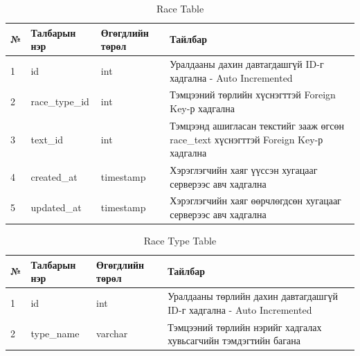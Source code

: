 \begin{table}[h]
	\caption{Race Table}
	\begin{tabular}{|l|l|l|p{8cm}|}
		\hline
		№ & Талбарын нэр   & Өгөгдлийн төрөл & Тайлбар                                                                             \\ \hline
		1 & id             & int             & Уралдааны дахин давтагдашгүй ID-г хадгална - Auto Incremented                       \\ \hline
		2 & race\_type\_id & int             & Тэмцээний төрлийн хүснэгттэй Foreign Key-р хадгална                                 \\ \hline
		3 & text\_id       & int             & Тэмцээнд ашигласан текстийг зааж өгсөн race\_text хүснэгттэй Foreign Key-р хадгална \\ \hline
		4 & created\_at    & timestamp       & Хэрэглэгчийн хаяг үүссэн хугацааг серверээс авч хадгална                            \\ \hline
		5 & updated\_at    & timestamp       & Хэрэглэгчийн хаяг өөрчлөгдсөн хугацааг серверээс авч хадгална                       \\ \hline
	\end{tabular}
\end{table}


\begin{table}[h]
	\caption{Race Type Table}
	\begin{tabular}{|l|l|l|p{8cm}|}
		\hline
		№ & Талбарын нэр & Өгөгдлийн төрөл & Тайлбар                                                               \\ \hline
		1 & id           & int             & Уралдааны төрлийн дахин давтагдашгүй ID-г хадгална - Auto Incremented \\ \hline
		2 & type\_name   & varchar         & Тэмцээний төрлийн нэрийг хадгалах хувьсагчийн тэмдэгтийн багана       \\ \hline
	\end{tabular}
\end{table}

